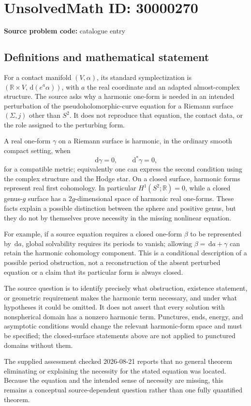 \documentclass[11pt]{article}
\newcommand{\R}{\mathbb{R}}
\newcommand{\dd}{\,\mathrm{d}}
\begin{document}
\section*{UnsolvedMath ID: 30000270}
\textbf{Source problem code:} catalogue entry
\subsection{Definitions and mathematical statement}
For a contact manifold \((V,\alpha)\), its standard symplectization is \((\R\times V,\dd(e^a\alpha))\), with \(a\) the real coordinate and an adapted almost-complex structure. The source asks why a harmonic one-form is needed in an intended perturbation of the pseudoholomorphic-curve equation for a Riemann surface \((\Sigma,j)\) other than \(S^2\). It does not reproduce that equation, the contact data, or the role assigned to the perturbing form.

A real one-form \(\gamma\) on a Riemann surface is harmonic, in the ordinary smooth compact setting, when
\[
\dd\gamma=0,\qquad\dd^*\gamma=0,
\]
for a compatible metric; equivalently one can express the second condition using the complex structure and the Hodge star. On a closed surface, harmonic forms represent real first cohomology. In particular \(H^1(S^2;\R)=0\), while a closed genus-\(g\) surface has a \(2g\)-dimensional space of harmonic real one-forms. These facts explain a possible distinction between the sphere and positive genus, but they do not by themselves prove necessity in the missing nonlinear equation.

For example, if a source equation requires a closed one-form \(\beta\) to be represented by \(\dd a\), global solvability requires its periods to vanish; allowing \(\beta=\dd a+\gamma\) can retain the harmonic cohomology component. This is a conditional description of a possible period obstruction, not a reconstruction of the absent perturbed equation or a claim that its particular form is always closed.

The source question is to identify precisely what obstruction, existence statement, or geometric requirement makes the harmonic term necessary, and under what hypotheses it could be omitted. It does not assert that every solution with nonspherical domain has a nonzero harmonic term. Punctures, ends, energy, and asymptotic conditions would change the relevant harmonic-form space and must be specified; the closed-surface statements above are not applied to punctured domains without them.

The supplied assessment checked 2026-08-21 reports that no general theorem eliminating or explaining the necessity for the stated equation was located. Because the equation and the intended sense of necessity are missing, this remains a conceptual source-dependent question rather than one fully quantified theorem.
\end{document}
